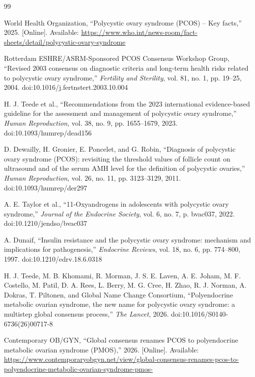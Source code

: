 \documentclass[conference]{IEEEtran}
\begin{document}
\begin{thebibliography}{99}

World Health Organization, ``Polycystic ovary syndrome (PCOS) -- Key facts,'' 2025. [Online]. Available: \url{https://www.who.int/news-room/fact-sheets/detail/polycystic-ovary-syndrome}

Rotterdam ESHRE/ASRM-Sponsored PCOS Consensus Workshop Group, ``Revised 2003 consensus on diagnostic criteria and long-term health risks related to polycystic ovary syndrome,'' \textit{Fertility and Sterility}, vol. 81, no. 1, pp. 19--25, 2004. doi:10.1016/j.fertnstert.2003.10.004

H. J. Teede et al., ``Recommendations from the 2023 international evidence-based guideline for the assessment and management of polycystic ovary syndrome,'' \textit{Human Reproduction}, vol. 38, no. 9, pp. 1655--1679, 2023. doi:10.1093/humrep/dead156

D. Dewailly, H. Gronier, E. Poncelet, and G. Robin, ``Diagnosis of polycystic ovary syndrome (PCOS): revisiting the threshold values of follicle count on ultrasound and of the serum AMH level for the definition of polycystic ovaries,'' \textit{Human Reproduction}, vol. 26, no. 11, pp. 3123--3129, 2011. doi:10.1093/humrep/der297

A. E. Taylor et al., ``11-Oxyandrogens in adolescents with polycystic ovary syndrome,'' \textit{Journal of the Endocrine Society}, vol. 6, no. 7, p. bvac037, 2022. doi:10.1210/jendso/bvac037

A. Dunaif, ``Insulin resistance and the polycystic ovary syndrome: mechanism and implications for pathogenesis,'' \textit{Endocrine Reviews}, vol. 18, no. 6, pp. 774--800, 1997. doi:10.1210/edrv.18.6.0318

H. J. Teede, M. B. Khomami, R. Morman, J. S. E. Laven, A. E. Joham, M. F. Costello, M. Patil, D. A. Rees, L. Berry, M. G. Cree, H. Zhao, R. J. Norman, A. Dokras, T. Piltonen, and Global Name Change Consortium, ``Polyendocrine metabolic ovarian syndrome, the new name for polycystic ovary syndrome: a multistep global consensus process,'' \textit{The Lancet}, 2026. doi:10.1016/S0140-6736(26)00717-8

Contemporary OB/GYN, ``Global consensus renames PCOS to polyendocrine metabolic ovarian syndrome (PMOS),'' 2026. [Online]. Available: \url{https://www.contemporaryobgyn.net/view/global-consensus-renames-pcos-to-polyendocrine-metabolic-ovarian-syndrome-pmos-}


\end{thebibliography}
\end{document}
